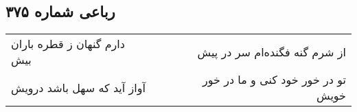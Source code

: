 \begin{center}
\section*{رباعی شماره ۳۷۵}
\label{sec:sh375}
\begin{longtable}{l p{0.5cm} r}
دارم گنهان ز قطره باران بیش
&&
از شرم گنه فگنده‌ام سر در پیش
\\
آواز آید که سهل باشد درویش
&&
تو در خور خود کنی و ما در خور خویش
\\
\end{longtable}
\end{center}
